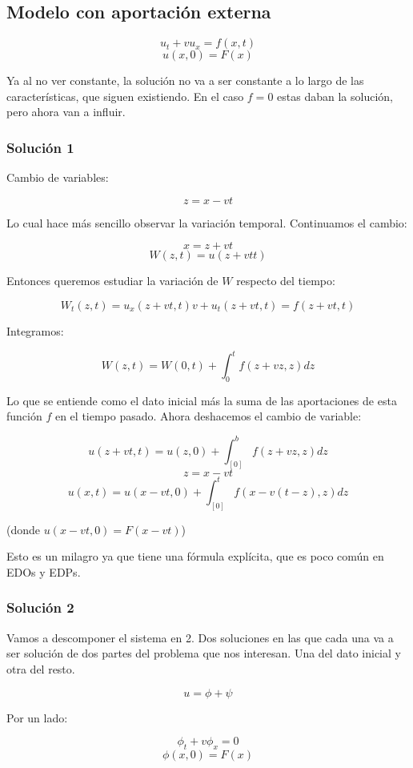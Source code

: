 \documentclass[palatino]{apuntes}
\begin{document}
\subsection{Modelo con aportación externa}

$$u_t + vu_x = f(x,t)$$
$$u(x,0) = F(x)$$

Ya al no ver constante, la solución no va a ser constante a lo largo de las características, que siguen existiendo. En el caso $f = 0$ estas daban la solución, pero ahora van a influir.

\subsubsection{Solución 1}

Cambio de variables:

$$z = x-vt$$

Lo cual hace más sencillo observar la variación temporal. Continuamos el cambio:

$$x = z + vt$$
$$W(z,t) = u(z+vtt)$$

Entonces queremos estudiar la variación de $W$ respecto del tiempo:

$$W_t(z,t) = u_x(z + vt, t)v + u_t(z+vt, t) = f(z + vt, t)$$

Integramos:

$$W(z,t) = W(0,t) + \int^{t}_{0} f(z+vz, z) dz $$

Lo que se entiende como el dato inicial más la suma de las aportaciones de esta función $f$ en el tiempo pasado. Ahora deshacemos el cambio de variable:

$$u(z + vt, t) = u(z,0) + \int^{b}_[0] f(z+vz, z) dz$$
$$z = x-vt$$
$$u(x,t) = u(x-vt,0)+ \int^{t}_[0] f(x-v(t-z),z) dz$$

(donde $u(x-vt,0) = F(x-vt)$)

Esto es un milagro ya que tiene una fórmula explícita, que es poco común en EDOs y EDPs.

\subsubsection{Solución 2}

Vamos a descomponer el sistema en 2. Dos soluciones en las que cada una va a ser solución de dos partes del problema que nos interesan. Una del dato inicial y otra del resto.

$$u = \phi + \psi$$

Por un lado:

$$\phi_t + v\phi_x = 0$$
$$\phi(x,0) = F(x) $$
\end{document}
